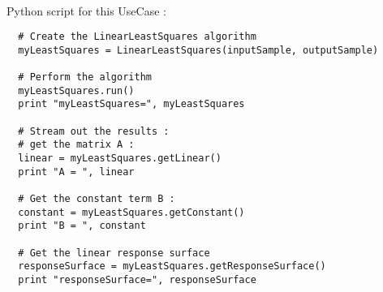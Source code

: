 \textspace\\
Python  script for this UseCase :

\begin{lstlisting}
  # Create the LinearLeastSquares algorithm
  myLeastSquares = LinearLeastSquares(inputSample, outputSample)

  # Perform the algorithm
  myLeastSquares.run()
  print "myLeastSquares=", myLeastSquares

  # Stream out the results :
  # get the matrix A :
  linear = myLeastSquares.getLinear()
  print "A = ", linear

  # Get the constant term B :
  constant = myLeastSquares.getConstant()
  print "B = ", constant

  # Get the linear response surface
  responseSurface = myLeastSquares.getResponseSurface()
  print "responseSurface=", responseSurface
\end{lstlisting}






